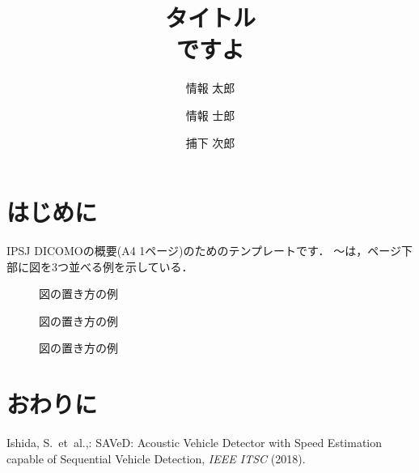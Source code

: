 \documentclass[Japanese]{dicomopapers}
\title{タイトル\\ ですよ}
\author{情報 太郎}{Taro Joho}{IPSJ}[taro@ipsj.or.jp]
\author{情報 士郎}{Shiro Joho}{IPSJ}
\author{捕下 次郎}{Jiro Hoge}{HOGE}
\begin{document}
\maketitle

\small

\section{はじめに}

IPSJ DICOMOの概要(A4 1ページ)のためのテンプレートです．
〜は，ページ下部に図を3つ並べる例を示している．

\begin{figure}[b]
 \begin{minipage}[t]{.32\textwidth}
  \centering
  \fbox{\rule{0pt}{3cm}\rule{3cm}{0pt}}
  \caption{図の置き方の例}
  \label{fig:test1}
 \end{minipage}
 \hfill
 \begin{minipage}[t]{.32\textwidth}
  \centering
  \fbox{\rule{0pt}{3cm}\rule{3cm}{0pt}}
  \caption{図の置き方の例}
  \label{fig:test2}
 \end{minipage}
 \hfil
 \begin{minipage}[t]{.32\textwidth}
  \centering
  \fbox{\rule{0pt}{3cm}\rule{3cm}{0pt}}
  \caption{図の置き方の例}
  \label{fig:test3}
 \end{minipage}
\end{figure}

\section{}

\section{おわりに}

%
%

\begin{thebibliography}{1}

Ishida, S.\ et~al.,: {SAVeD}:
  Acoustic Vehicle Detector with Speed Estimation capable of Sequential Vehicle
  Detection, {\em {IEEE} ITSC} (2018).

\end{thebibliography}
\end{document}
